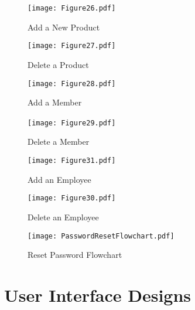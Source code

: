 \begin{landscape}
\begin{figure}[H]
\caption{Add a New Product} \label{fig:Add a New Product}
\hfill\texttt{[image: Figure26.pdf]}\hspace*{\fill}
\end{figure}
\pagebreak

\begin{figure}[H]
\caption{Delete a Product} \label{fig:Delete a Product}
\hfill\texttt{[image: Figure27.pdf]}\hspace*{\fill}
\end{figure}
\pagebreak

\begin{figure}[H]
\caption{Add a Member} \label{fig:Add a Member}
\hfill\texttt{[image: Figure28.pdf]}\hspace*{\fill}
\end{figure}
\pagebreak

\begin{figure}[H]
\caption{Delete a Member} \label{fig:Delete a Member}
\hfill\texttt{[image: Figure29.pdf]}\hspace*{\fill}\
\end{figure}
\pagebreak

\begin{figure}[H]
\caption{Add an Employee} \label{fig:Add an Employee}
\hfill\texttt{[image: Figure31.pdf]}\hspace*{\fill}
\end{figure}
\pagebreak

\begin{figure}[H]
\caption{Delete an Employee} \label{fig:Delete an Employee}
\hfill\texttt{[image: Figure30.pdf]}\hspace*{\fill}
\end{figure}
\pagebreak

\begin{figure}[H]
\caption{Reset Password Flowchart} \label{fig:Reset Password Flowchart}
\hfill\texttt{[image: PasswordResetFlowchart.pdf]}\hspace*{\fill}
\end{figure}
\pagebreak

\end{landscape}
\section{User Interface Designs}


